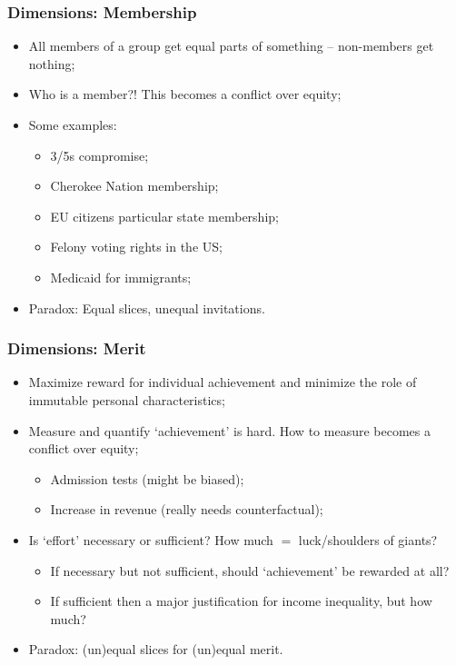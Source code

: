 \documentclass[aspectratio=169]{beamer}
\theoremstyle{principle}
\begin{document}
\begin{frame}
\frametitle{Dimensions: Membership}

\begin{itemize}
\item All members of a group get equal parts of something -- non-members get nothing;
\bigskip
\bigskip
\item Who is a member?!  This becomes a conflict over equity;
\bigskip
\bigskip
\item Some examples:
\begin{itemize}
\item 3/5s compromise;
\item Cherokee Nation membership;
\item EU citizens particular state membership;
\item Felony voting rights in the US;
\item Medicaid for immigrants;
\end{itemize}
\bigskip
\bigskip
\item Paradox: Equal slices, unequal invitations.
\end{itemize}

\end{frame}

\begin{frame}
\frametitle{Dimensions: Merit}

\begin{itemize}
\item Maximize reward for individual achievement and minimize the role of immutable personal characteristics;
\bigskip
\bigskip
\item Measure and quantify `achievement' is hard.  How to measure becomes a conflict over equity;
\begin{itemize}
\item Admission tests (might be biased);
\item Increase in revenue (really needs counterfactual);
\end{itemize}
\bigskip
\bigskip
\item Is `effort' necessary or sufficient? How much $=$ luck/shoulders of giants?  
\begin{itemize}
\item If necessary but not sufficient, should `achievement' be rewarded at all?
\item If sufficient then a major justification for income inequality, but how much?
\end{itemize}
\bigskip
\bigskip
\item Paradox: (un)equal slices for (un)equal merit.
\end{itemize}

\end{frame}
\end{document}
